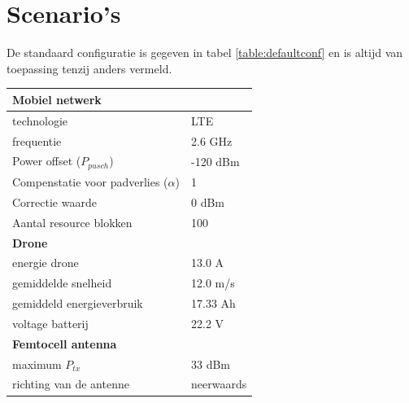 \documentclass[twocolumn]{phdsymp} %
\begin{document}

\section{Scenario's}

De standaard configuratie is gegeven in tabel \ref{table:defaultconf} en is altijd van toepassing tenzij anders vermeld.
\begin{table}[!htb]
\centering
\begin{tabular}[t]{ll}
        \toprule
        \multicolumn{2}{l}{\textbf{Mobiel netwerk}} \\
        \hline
        \hspace{3mm}  technologie        & LTE     \\
        \hspace{3mm}  frequentie         & 2.6 GHz \\
        \hspace{3mm}  Power offset ($P_{pusch}$)            & -120 dBm  \\
        \hspace{3mm}  Compenstatie voor padverlies ($\alpha$)   & 1  \\
        \hspace{3mm}  Correctie waarde                    & 0 dBm  \\
        \hspace{3mm}  Aantal resource blokken      & 100  \\
        \hline
        \multicolumn{2}{l}{\textbf{Drone}} \\
        \hline  
        \hspace{3mm}  energie drone        & 13.0 A   \\
        \hspace{3mm}  gemiddelde snelheid        & 12.0 m/s \\
        \hspace{3mm}  gemiddeld energieverbruik      & 17.33 Ah    \\
        \hspace{3mm}  voltage batterij       & 22.2 V \\
        \hline
        \multicolumn{2}{l}{\textbf{Femtocell antenna}} \\
        \hline  
        \hspace{3mm}  maximum $P_{tx}$          & 33 dBm   \\
        \hspace{3mm}  richting van de antenne   & neerwaards   \\ 

\end{tabular}
\end{table}
\end{document}
